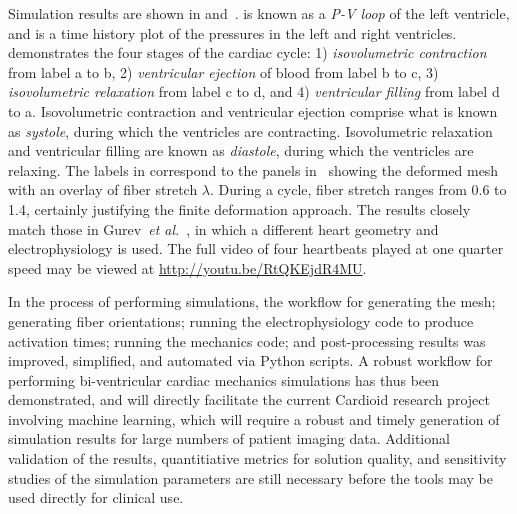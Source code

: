 Simulation results are shown in  and~.  is known as a \textit{P-V loop} of the left ventricle, and  is a time history plot of the pressures in the left and right ventricles.  demonstrates the four stages of the cardiac cycle: 1) \textit{isovolumetric contraction} from label a to b, 2) \textit{ventricular ejection} of blood from label b to c, 3) \textit{isovolumetric relaxation} from label c to d, and 4) \textit{ventricular filling} from label d to a. Isovolumetric contraction and ventricular ejection comprise what is known as \textit{systole}, during which the ventricles are contracting. Isovolumetric relaxation and ventricular filling are known as \textit{diastole}, during which the ventricles are relaxing. The labels in  correspond to the panels in~ showing the deformed mesh with an overlay of fiber stretch $\lambda$. During a cycle, fiber stretch ranges from 0.6 to 1.4, certainly justifying the finite deformation approach. The results closely match those in Gurev~\textit{et al.}~\cite{gurev_2015}, in which a different heart geometry and electrophysiology is used. The full video of four heartbeats played at one quarter speed may be viewed at \href{http://youtu.be/RtQKEjdR4MU}{{\url{http://youtu.be/RtQKEjdR4MU}}}.

In the process of performing simulations, the workflow for generating the mesh; generating fiber orientations; running the electrophysiology code to produce activation times; running the mechanics code; and post-processing results was improved, simplified, and automated via Python scripts. A robust workflow for performing bi-ventricular cardiac mechanics simulations has thus been demonstrated, and will directly facilitate the current Cardioid research project involving machine learning, which will require a robust and timely generation of simulation results for large numbers of patient imaging data. Additional validation of the results, quantitiative metrics for solution quality, and sensitivity studies of the simulation parameters are still necessary before the tools may be used directly for clinical use.

